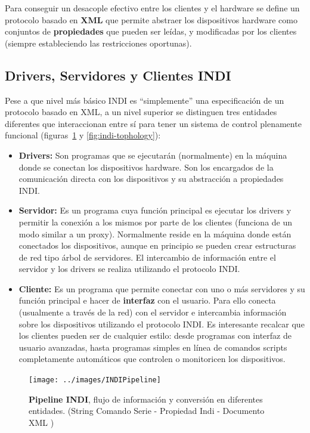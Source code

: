 Para conseguir un desacople efectivo entre los clientes y el hardware se define un protocolo basado en \textbf{XML} que permite abstraer los dispositivos hardware como conjuntos de \textbf{propiedades} que pueden ser leídas, y modificadas por los clientes (siempre estableciendo las restricciones oportunas).


\subsection{Drivers, Servidores y Clientes INDI}

Pese a que nivel más básico INDI es ``simplemente'' una especificación de un protocolo basado en XML, a un nivel superior se distinguen tres entidades diferentes que interaccionan entre sí para tener un sistema de control plenamente funcional (figuras~\ref{fig:DriverServerIndi} y \ref{fig:indi-tophology}):


\begin{itemize}
	\item \textbf{Drivers:} Son programas que se ejecutarán (normalmente) en la máquina donde se conectan los dispositivos hardware. Son los encargados de la comunicación directa con los dispositivos y su abstracción a propiedades INDI.
		
	\item \textbf{Servidor:} Es un programa cuya función principal es ejecutar los drivers y permitir la conexión a los mismos por parte de los clientes (funciona de un modo similar a un proxy). Normalmente reside en la máquina donde están conectados los dispositivos, aunque en principio se pueden crear estructuras de red tipo árbol de servidores. El intercambio de información entre el servidor y los drivers se realiza utilizando el protocolo INDI.
	
	\item \textbf{Cliente:} Es un programa que permite conectar con uno o más servidores y su función principal e hacer de \textbf{interfaz} con el usuario. Para ello conecta (usualmente a través de la red) con el servidor e intercambia información sobre los dispositivos utilizando el protocolo INDI. Es interesante recalcar que los clientes pueden ser de cualquier estilo: desde programas con interfaz de usuario avanzadas, hasta programas simples en línea de comandos scripts completamente automáticos que controlen o monitoricen los dispositivos.
\end{itemize}


\begin{figure}[h]
	\centering
	\texttt{[image: ../images/INDIPipeline]}
	\caption[Pipeline INDI]{\textbf{Pipeline INDI}, flujo de información y conversión en diferentes entidades. (String Comando Serie - Propiedad Indi - Documento XML )}
	\label{fig:DriverServerIndi}
\end{figure}

